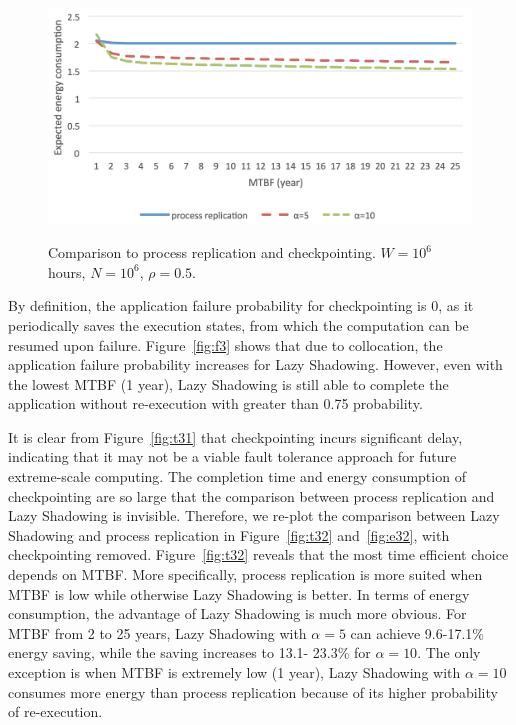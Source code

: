 \begin{figure}[!t]
\begin{center}
{			\includegraphics[width=\columnwidth]{Figures/e32}
		} 
	\end{center}
	\caption{Comparison to process replication and checkpointing. $W=10^6$ hours, $N=10^6$, $\rho=0.5$.}
	\label{fig:3}
\end{figure}

By definition, the application failure probability for checkpointing is 0, as it periodically saves the execution states, from which the computation can be resumed upon failure. Figure~\ref{fig:f3} shows that due to collocation, the application failure probability increases for Lazy Shadowing. However, even with the lowest MTBF (1 year), Lazy Shadowing is still able to complete the application without re-execution with greater than 0.75 probability. 

It is clear from Figure~\ref{fig:t31} that checkpointing incurs significant delay, indicating that it may not be a viable fault tolerance approach for future extreme-scale computing. The completion time and energy consumption of checkpointing are so large that the comparison between process replication and Lazy Shadowing is invisible. Therefore, we re-plot the comparison between Lazy Shadowing and process replication in Figure~\ref{fig:t32} and~\ref{fig:e32}, with checkpointing removed. Figure~\ref{fig:t32} reveals that the most time efficient choice depends on MTBF. More specifically, process replication is more suited when MTBF is low while otherwise Lazy Shadowing is better. In terms of energy consumption, the advantage of Lazy Shadowing is much more obvious. For MTBF from 2 to 25 years, Lazy Shadowing with $\alpha=5$ can achieve 9.6-17.1\% energy saving, while the saving increases to 13.1- 23.3\% for $\alpha=10$. The only exception is when MTBF is extremely low (1 year), Lazy Shadowing with $\alpha=10$ consumes more energy than process replication because of its higher probability of re-execution.






